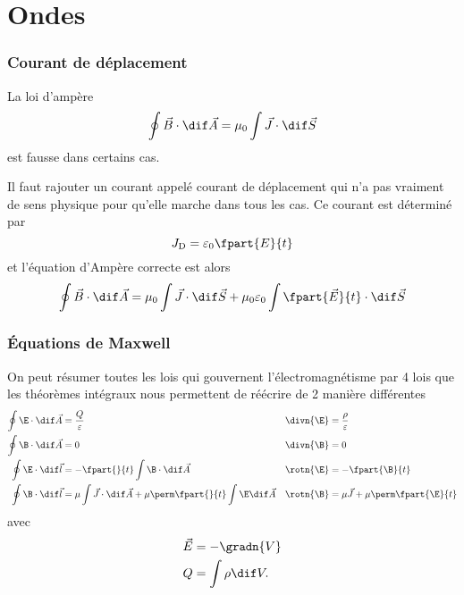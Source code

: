 


\part{Ondes}
\section{Courant de déplacement}
La loi d'ampère
\[ \oint \vec{B} \cdot \dif \vec{A} = \mu_0 \int \vec{J} \cdot \dif \vec{S} \]
est fausse dans certains cas.

Il faut rajouter un courant appelé courant de déplacement qui n'a pas
vraiment de sens physique pour qu'elle marche dans tous les cas.
Ce courant est déterminé par
\[ J_\mathrm{D} = \varepsilon_0\fpart{E}{t} \]
et l'équation d'Ampère correcte est alors
\[ \oint \vec{B} \cdot \dif \vec{A} =
\mu_0 \int \vec{J} \cdot \dif \vec{S} +
\mu_0\varepsilon_0 \int\fpart{\vec{E}}{t} \cdot \dif \vec{S} \]

\section{Équations de Maxwell}
On peut résumer toutes les lois qui gouvernent l'électromagnétisme
par 4 lois que les théorèmes intégraux nous permettent de réécrire
de 2 manière différentes
\begin{align*}
  \oint \E \cdot \dif \vec{A} & = \frac{Q}{\varepsilon}
  & \divn{\E} & = \frac{\rho}{\varepsilon}\\
  \oint \B \cdot \dif \vec{A} & = 0
  & \divn{\B} & = 0\\
  \oint \E \cdot \dif \vec{l} & = -\fpart{}{t} \int \B \cdot \dif \vec{A}
  & \rotn{\E} & = -\fpart{\B}{t}\\
  \oint \B \cdot \dif \vec{l} & = \mu \int \vec{J} \cdot \dif \vec{A}
  + \mu\perm\fpart{}{t} \int \E \dif \vec{A}
  & \rotn{\B} & = \mu\vec{J} + \mu\perm\fpart{\E}{t}
\end{align*}
avec
\begin{align*}
  \vec{E} & = -\gradn{V}\\
  Q & = \int \rho \dif V.
\end{align*}

